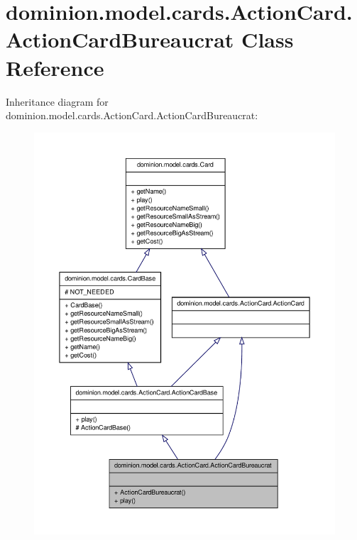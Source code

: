 \hypertarget{classdominion_1_1model_1_1cards_1_1ActionCard_1_1ActionCardBureaucrat}{\section{dominion.\-model.\-cards.\-Action\-Card.\-Action\-Card\-Bureaucrat \-Class \-Reference}
\label{classdominion_1_1model_1_1cards_1_1ActionCard_1_1ActionCardBureaucrat}
}


\-Inheritance diagram for dominion.\-model.\-cards.\-Action\-Card.\-Action\-Card\-Bureaucrat\-:
\nopagebreak
\begin{figure}[H]
\begin{center}
\leavevmode
\includegraphics[width=350pt]{classdominion_1_1model_1_1cards_1_1ActionCard_1_1ActionCardBureaucrat__inherit__graph}
\end{center}
\end{figure}


